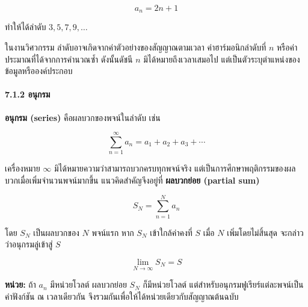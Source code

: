 \[
a_n=2n+1
\]

ทำให้ได้ลำดับ \(3,5,7,9,\ldots\)

ในงานวิศวกรรม ลำดับอาจเกิดจากค่าตัวอย่างของสัญญาณตามเวลา ค่าฮาร์มอนิกลำดับที่ \(n\) หรือค่าประมาณที่ได้จากการคำนวณซ้ำ ดังนั้นดัชนี \(n\) มิได้หมายถึงเวลาเสมอไป แต่เป็นตัวระบุตำแหน่งของข้อมูลหรือองค์ประกอบ

\paragraph{7.1.2 อนุกรม}

\textbf{อนุกรม (series)} คือผลบวกของพจน์ในลำดับ เช่น

\[
\sum_{n=1}^{\infty}a_n=a_1+a_2+a_3+\cdots
\]

เครื่องหมาย \(\infty\) มิได้หมายความว่าสามารถบวกครบทุกพจน์จริง แต่เป็นการศึกษาพฤติกรรมของผลบวกเมื่อเพิ่มจำนวนพจน์มากขึ้น แนวคิดสำคัญจึงอยู่ที่ \textbf{ผลบวกย่อย (partial sum)}

\[
S_N=\sum_{n=1}^{N}a_n
\]

โดย \(S_N\) เป็นผลบวกของ \(N\) พจน์แรก หาก \(S_N\) เข้าใกล้ค่าคงที่ \(S\) เมื่อ \(N\) เพิ่มโดยไม่สิ้นสุด จะกล่าวว่าอนุกรมลู่เข้าสู่ \(S\)

\[
\lim_{N\to\infty}S_N=S
\]

\textbf{หน่วย:} ถ้า \(a_n\) มีหน่วยโวลต์ ผลบวกย่อย \(S_N\) ก็มีหน่วยโวลต์ แต่สำหรับอนุกรมฟูเรียร์แต่ละพจน์เป็นค่าฟังก์ชัน ณ เวลาเดียวกัน จึงรวมกันเพื่อให้ได้หน่วยเดียวกับสัญญาณต้นฉบับ


